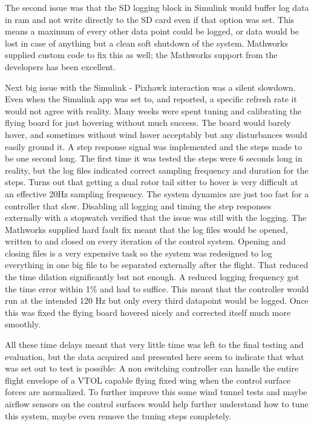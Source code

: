 \documentclass{article}
\begin{document}
The second issue was that the SD logging block in Simulink would buffer log data in ram and not write directly to the SD card even if that option was set.
This means a maximum of every other data point could be logged, or data would be lost in case of anything but a clean soft shutdown of the system.
Mathworks supplied custom code to fix this as well; the Mathworks support from the developers has been excellent.

Next big issue with the Simulink - Pixhawk interaction was a silent slowdown.
Even when the Simulink app was set to, and reported, a specific refresh rate it would not agree with reality.
Many weeks were spent tuning and calibrating the flying board for just hovering without much success. 
The board would barely hover, and sometimes without wind hover acceptably but any disturbances would easily ground it. 
A step response signal was implemented and the steps made to be one second long.
The first time it was tested the steps were 6 seconds long in reality, but the log files indicated correct sampling frequency and duration for the steps.
Turns out that getting a dual rotor tail sitter to hover is very difficult at an effective 20Hz sampling frequency.
The system dynamics are just too fast for a controller that slow.
Disabling all logging and timing the step responses externally with a stopwatch verified that the issue was still with the logging.
The Mathworks supplied hard fault fix meant that the log files would be opened, written to and closed on every iteration of the control system.
Opening and closing files is a very expensive task so the system was redesigned to log everything in one big file to be separated externally after the flight.
That reduced the time dilation significantly but not enough.
A reduced logging frequency got the time error within 1\% and had to suffice.
This meant that the controller would run at the intended 120 Hz but only every third datapoint would be logged.
Once this was fixed the flying board hovered nicely and corrected itself much more smoothly.

All these time delays meant that very little time was left to the final testing and evaluation, but the data acquired and presented here seem to indicate that what was set out to test is possible:
A non switching controller can handle the entire flight envelope of a VTOL capable flying fixed wing when the control surface forces are normalized.
To further improve this some wind tunnel tests and maybe airflow sensors on the control surfaces would help further understand how to tune this system, maybe even remove the tuning steps completely.
\end{document}
